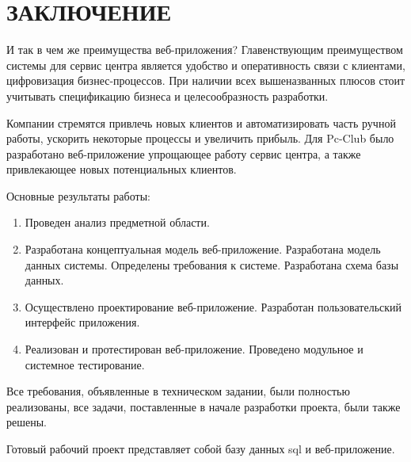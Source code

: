 \section*{ЗАКЛЮЧЕНИЕ}

И так в чем же преимущества веб-приложения? Главенствующим преимуществом системы для сервис центра является удобство и оперативность связи с клиентами, цифровизация бизнес-процессов. При наличии всех вышеназванных плюсов стоит учитывать спецификацию бизнеса и целесообразность разработки.
  
Компании стремятся привлечь новых клиентов и автоматизировать часть ручной работы, ускорить некоторые процессы и увеличить прибыль. Для Pc-Club было разработано веб-приложение упрощающее работу сервис центра, а также привлекающее новых потенциальных клиентов.

Основные результаты работы:

\begin{enumerate}
\item Проведен анализ предметной области.
\item Разработана концептуальная модель веб-приложение. Разработана модель данных системы. Определены требования к системе. Разработана схема базы данных.
\item Осуществлено проектирование веб-приложение. Разработан пользовательский интерфейс приложения.
\item Реализован и протестирован веб-приложение. Проведено модульное и системное тестирование.
\end{enumerate}

Все требования, объявленные в техническом задании, были полностью реализованы, все задачи, поставленные в начале разработки проекта, были также решены.

Готовый рабочий проект представляет собой базу данных sql и веб-приложение.